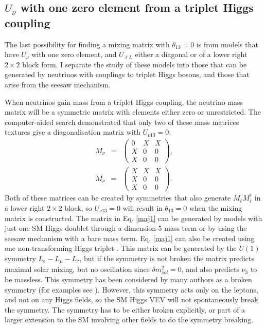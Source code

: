 \documentclass[nofootinbib,showpacs]{revtex4}
\begin{document}
\subsection{$U_\nu$ with one zero element from a triplet Higgs coupling}

The last possibility for finding a mixing matrix with $\theta_{13}=0$ is from models that have $U_\nu$ with one zero element, and $U_{\ell L}$ either a diagonal or of a lower right $2\times 2$ block form. I separate the study of these models into those that can be generated by neutrinos with couplings to triplet Higgs bosons, and those that arise from the seesaw mechanism. 


When neutrinos gain mass from a triplet Higgs coupling, the neutrino mass matrix will be a symmetric matrix with elements either zero or unrestricted.
The computer-aided search demonstrated that only two of these mass matrices textures give a diagonalisation matrix with $U_{\nu 13}=0$: 
\begin{eqnarray}
M_\nu&=&\left(\begin{array}{ccc}0&X&X\\X&0&0\\X&0&0\end{array}\right),\label{maj1}\\
M_\nu&=&\left(\begin{array}{ccc}X&X&X\\X&0&0\\X&0&0\end{array}\right).\label{maj2}
\end{eqnarray}
Both of these matrices can be created by symmetries that also generate $M_\ell M_\ell^\dagger$ in a lower right $2\times 2$ block, so $U_{\nu 13}=0$ will result in $\theta_{13}=0$ when the mixing matrix is constructed.
The matrix in Eq. \ref{maj1} can be generated by models with just one SM Higgs doublet through a dimension-5 mass term or by using the seesaw mechanism with a bare mass term. Eq. \ref{maj1} can also be created using one non-transforming Higgs triplet \cite{nogo1}. This matrix can be generated by the $U(1)$ symmetry $L_e-L_\mu-L_\tau$, but if the symmetry is not broken the matrix predicts maximal solar mixing, but no oscillation since $\delta m^2_{sol}=0$, and also predicts $\nu_3$ to be massless. This symmetry has been considered by many authors as a broken symmetry (for examples see \cite{rojL,lavL,grimlavL,barbieriL,petcovL,leungL,joshipuraL}). However, this symmetry acts only on the leptons, and not on any Higgs fields, so the SM Higgs VEV will not spontaneously break the symmetry. The symmetry has to be either broken explicitly, or part of a larger extension to the SM involving other fields to do the symmetry breaking. 
\end{document}
